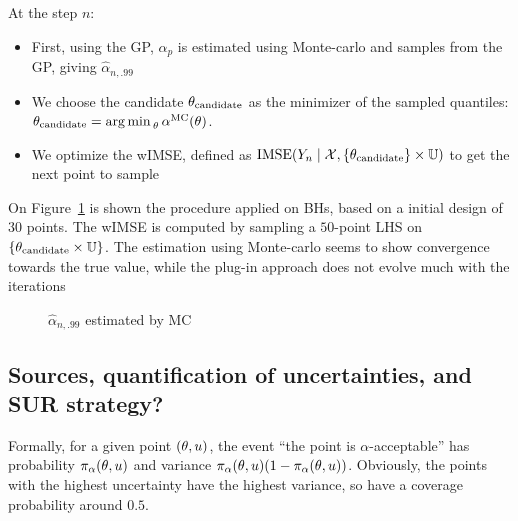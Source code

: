 \documentclass[../../Main_ManuscritThese.tex]{subfiles}
\begin{document}
At the step $n$:
\begin{itemize}
\item First, using the GP, $\alpha_p$ is estimated using Monte-carlo and samples from the GP, giving $\hat{\alpha}_{n,.99}$
\item We choose the candidate $\theta_{\mathrm{candidate}}$ as the minimizer of the sampled quantiles: $\theta_{\mathrm{candidate}} = \operatorname*{arg\,min \,}_{\theta} \alpha^{\mathrm{MC}}(\theta)$.
\item We optimize the wIMSE, defined as $\operatorname{\mathrm{IMSE}}(Y_n \mid \mathcal{X}, \{\theta_{\mathrm{candidate}}\}\times \mathbb{U} )$ to get the next point to sample
\end{itemize}
On Figure~\cref{fig:alpha_MC} is shown the procedure applied on BHs, based on a initial design of $30$ points. The wIMSE is computed by sampling a $50$-point LHS on $\{\theta_{\mathrm{candidate}} \times \mathbb{U}\}$.
The estimation using Monte-carlo seems to show convergence towards the true value, while the plug-in approach does not evolve much with the iterations
\begin{figure}[!h]
  \centering
  
  \label{fig:alpha_MC}
  \caption{$\hat{\alpha}_{n,.99}$ estimated by MC }
\end{figure}

%   





\subsection{Sources, quantification of uncertainties, and SUR strategy?}
Formally, for a given point $(\theta,u)$, the event ``the point is $\alpha$-acceptable'' has probability $\pi_{\alpha}(\theta,u)$ and variance $\pi_{\alpha}(\theta,u) (1-\pi_{\alpha}(\theta,u))$. Obviously, the points with the highest uncertainty have the highest variance, so have a coverage probability around $0.5$.
\end{document}
